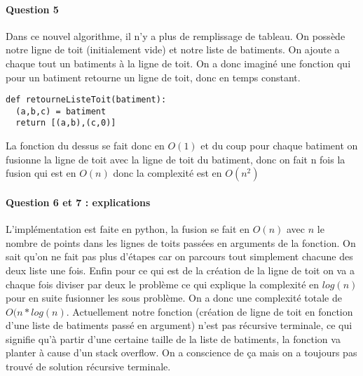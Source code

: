 \documentclass[a4paper,10pt]{article}
\begin{document}
\paragraph{Question 5}
Dans ce nouvel algorithme, il n'y a plus de remplissage de tableau. On possède notre ligne de toit (initialement vide) et notre liste de batiments.
On ajoute a chaque tout un batiments à la ligne de toit. On a donc imaginé une fonction qui pour un batiment retourne un ligne de toit, donc en temps constant.

\begin{lstlisting}
def retourneListeToit(batiment):
  (a,b,c) = batiment
  return [(a,b),(c,0)] 
\end{lstlisting}

La fonction du dessus se fait donc en $O(1)$ et du coup pour chaque batiment on fusionne la ligne de toit avec la ligne de toit du batiment,
donc on fait n fois la fusion qui est en $O(n)$ donc la complexité est en $O(n^2)$

\paragraph{Question 6 et 7 : explications}
L'implémentation est faite en python, la fusion se fait en $O(n)$ avec $n$ le nombre de points dans les lignes de toits passées en arguments de la fonction.
On sait qu'on ne fait pas plus d'étapes car on parcours tout simplement chacune des deux liste une fois. Enfin pour ce qui est de la création de la ligne de toit on va a chaque fois 
diviser par deux le problème ce qui explique la complexité en $log(n)$ pour en suite fusionner les sous problème. On a donc une complexité totale de $O(n*log(n)$.
Actuellement notre fonction (création de ligne de toit en fonction d'une liste de batiments passé en argument) n'est pas récursive terminale, ce qui signifie qu'à partir 
d'une certaine taille de la liste de batiments, la fonction va planter à cause d'un stack overflow. On a conscience de ça mais on a toujours pas trouvé de solution récursive terminale.
\end{document}
